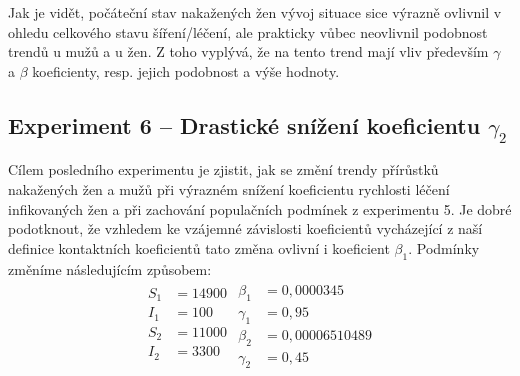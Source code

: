 \documentclass{article}
\begin{document}
Jak je vidět, počáteční stav nakažených žen vývoj situace sice výrazně ovlivnil v ohledu celkového stavu šíření/léčení, ale prakticky vůbec neovlivnil podobnost trendů u mužů a u žen. Z toho vyplývá, že na tento trend mají vliv především $\gamma$ a $\beta$ koeficienty, resp. jejich podobnost a výše hodnoty.
\newpage

\subsection{Experiment 6 -- Drastické snížení koeficientu $\gamma_2$}
Cílem posledního experimentu je zjistit, jak se změní trendy přírůstků nakažených žen a mužů při výrazném snížení koeficientu rychlosti léčení infikovaných žen a při zachování populačních podmínek z experimentu 5. Je dobré podotknout, že vzhledem ke vzájemné závislosti koeficientů vycházející z naší definice kontaktních koeficientů tato změna ovlivní i koeficient $\beta_1$. Podmínky změníme následujícím způsobem:
\begin{align}
\begin{split}
    S_1&=14900\\
    I_1&=100\\
    S_2&=11000\\
    I_2&=3300\\
\end{split}
\begin{split}
    \beta_1&=0,0000345\\
    \gamma_1&=0,95\\
    \beta_2&=0,00006510489\\
    \gamma_2&=0,45\nonumber
\end{split}
\end{align}
\end{document}
